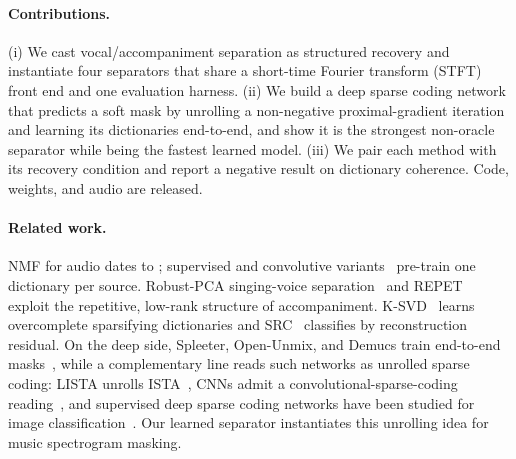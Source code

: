 \documentclass{article}
\begin{document}
\paragraph{Contributions.} (i) We cast vocal/accompaniment separation as
structured recovery and instantiate four separators that share a short-time
Fourier transform (STFT) front end and one evaluation harness. (ii) We build a deep
sparse coding network that predicts a soft mask by unrolling a non-negative
proximal-gradient iteration and learning its dictionaries end-to-end, and show it
is the strongest non-oracle separator while being the fastest learned model. (iii)
We pair each method with its recovery condition and report a negative result on
dictionary coherence. Code, weights, and audio are released.

\paragraph{Related work.}
NMF for audio dates to \citet{smaragdis2003nmf}; supervised and convolutive
variants~\cite{smaragdis2007convolutive,fevotte2009isnmf} pre-train one dictionary
per source. Robust-PCA singing-voice separation~\cite{huang2012rpca} and
REPET~\cite{rafii2013repet} exploit the repetitive, low-rank structure of
accompaniment. K-SVD~\cite{aharon2006ksvd} learns overcomplete sparsifying
dictionaries and SRC~\cite{wright2009src} classifies by reconstruction residual.
On the deep side, Spleeter, Open-Unmix, and Demucs train end-to-end
masks~\cite{stoter2019openunmix,defossez2021demucs,rouard2023htdemucs}, while a
complementary line reads such networks as unrolled sparse coding: LISTA unrolls
ISTA~\cite{gregor2010lista}, CNNs admit a convolutional-sparse-coding
reading~\cite{papyan2017cnncsc}, and supervised deep sparse coding networks have
been studied for image classification~\cite{sun2019scn}. Our learned separator
instantiates this unrolling idea for music spectrogram masking.
\end{document}
